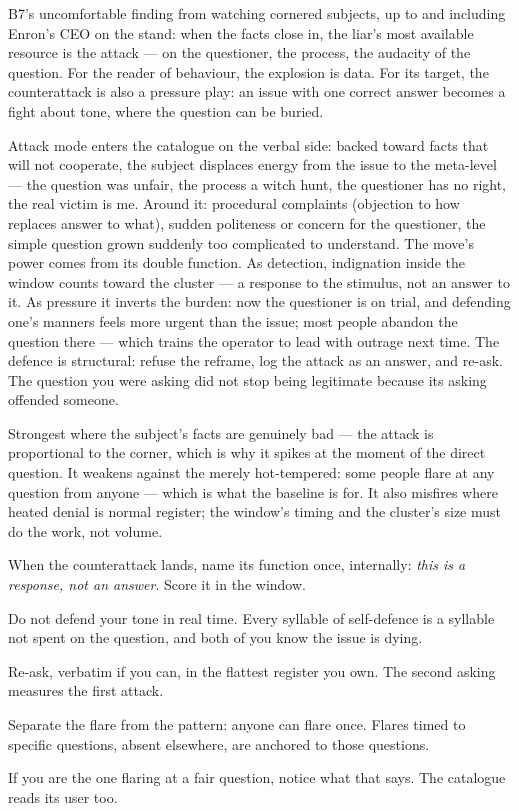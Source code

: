 \begin{core}
B7's uncomfortable finding from watching cornered subjects, up to and including Enron's CEO on the stand: when the facts close in, the liar's most available resource is the attack --- on the questioner, the process, the audacity of the question. For the reader of behaviour, the explosion is data. For its target, the counterattack is also a pressure play: an issue with one correct answer becomes a fight about tone, where the question can be buried.
\end{core}
\begin{mechanism}
Attack mode enters the catalogue on the verbal side: backed toward facts that will not cooperate, the subject displaces energy from the issue to the meta-level --- the question was unfair, the process a witch hunt, the questioner has no right, the real victim is me. Around it: procedural complaints (objection to how replaces answer to what), sudden politeness or concern for the questioner, the simple question grown suddenly too complicated to understand. The move's power comes from its double function. As detection, indignation inside the window counts toward the cluster --- a response to the stimulus, not an answer to it. As pressure it inverts the burden: now the questioner is on trial, and defending one's manners feels more urgent than the issue; most people abandon the question there --- which trains the operator to lead with outrage next time. The defence is structural: refuse the reframe, log the attack as an answer, and re-ask. The question you were asking did not stop being legitimate because its asking offended someone.
\end{mechanism}
\begin{conditions}
Strongest where the subject's facts are genuinely bad --- the attack is proportional to the corner, which is why it spikes at the moment of the direct question. It weakens against the merely hot-tempered: some people flare at any question from anyone --- which is what the baseline is for. It also misfires where heated denial is normal register; the window's timing and the cluster's size must do the work, not volume.
\end{conditions}
\begin{application}
  \item When the counterattack lands, name its function once, internally: \emph{this is a response, not an answer}. Score it in the window.
  \item Do not defend your tone in real time. Every syllable of self-defence is a syllable not spent on the question, and both of you know the issue is dying.
  \item Re-ask, verbatim if you can, in the flattest register you own. The second asking measures the first attack.
  \item Separate the flare from the pattern: anyone can flare once. Flares timed to specific questions, absent elsewhere, are anchored to those questions.
  \item If you are the one flaring at a fair question, notice what that says. The catalogue reads its user too.
\end{application}
